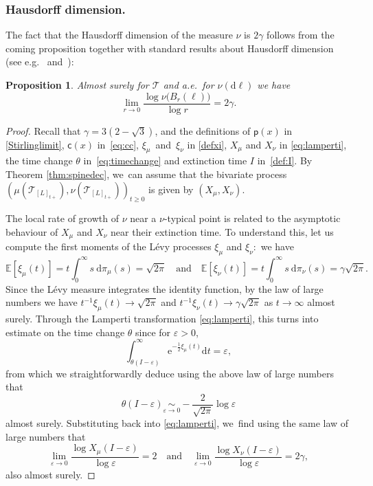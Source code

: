 \documentclass[11pt]{article}
\let\dH\gamma
\newcommand{\pp}{\mathsf{p}}
\newcommand{\cc}{\mathsf{c}}\let\ff\cc
\newcommand{\T}{\mathcal{T}}\let\CRT\T\let\tbr\T
\let\veps\varepsilon
\newtheorem{prop}[thm]{Proposition}
\theoremstyle{definition}
\begin{document}
\subsubsection*{Hausdorff dimension.}

The fact that the Hausdorff dimension of the measure $\nu$ is $2 \dH$ follows from the coming proposition together with standard results about Hausdorff dimension (see e.g.~\cite[Lem.\,4.1]{lyons1995ergodic} and~\cite[\S 14]{billingsley1965}):

\begin{prop}\label{prop:continuous Hausdorff} Almost surely for $\mathcal{T}$ and a.e.\ for $\nu(\mathrm{d}\ell)$ we have
\[
\lim_{r \to 0} \frac{\log \nu \big(B_r(\ell)\big) }{\log r} = 2 \dH.
\]
\end{prop}

\begin{proof}
Recall that $\gamma=3(2-\sqrt{3})$, and the definitions of $\pp(x)$ in \eqref{Stirlinglimit}, $\cc(x)$ in~\eqref{eq:cc}, $\xi_\mu$~and~$\xi_\nu$ in \eqref{defxi}, $X_\mu$ and $X_\nu$ in \eqref{eq:lamperti}, the time change $\theta$ in~\eqref{eq:timechange} and extinction time $I$ in~\eqref{def:I}. By Theorem \ref{thm:spinedec}, we~can assume that the bivariate process $(\mu(\T_{[L]_{t+}}),\nu(\T_{[L]_{t+}}))_{t\geq 0}$ is given by $(X_\mu,X_\nu)$.

The local rate of growth of $\nu$ near a $\nu$-typical point is related to the asymptotic behaviour of $X_\mu$ and $X_\nu$ near their extinction time. To understand this, let us compute the first moments of the Lévy processes $\xi_\mu$ and $\xi_\nu:$ we have
\[
\mathbb{E}[\xi_\mu(t)] = t \int_0^{\infty} s\ \mathrm{d}\pi_\mu(s) = \sqrt{2 \pi} \quad \text{and}\quad \mathbb{E}[\xi_\nu(t)] = t \int_0^{\infty} s\ \mathrm{d}\pi_\nu(s) = \dH \sqrt{2\pi}.
\]
Since the Lévy measure integrates the identity function, by the law of large numbers we have $t^{-1}\xi_\mu (t) \to \sqrt{2 \pi}$ and $t^{-1}\xi_\nu (t) \to \dH \sqrt{2\pi}$ as $t \to \infty$ almost surely. Through the Lamperti transformation \eqref{eq:lamperti}, this turns into estimate on the time change $\theta$ since for $\veps>0$,
\[
\int_{\theta(I-\veps)}^{\infty} \mathrm{e}^{-\frac12 \xi_\mu(t)}\mathrm dt=\veps,
\]
from which we straightforwardly deduce using the above law of large numbers that
\[
\theta(I-\veps)\underset{\veps\to 0}\sim-\frac2{\sqrt{2\pi}}\log \veps
\]
almost surely. Substituting back into \eqref{eq:lamperti}, we~find using the same law of large numbers that
\[
\lim_{ \varepsilon \to 0}\frac{\log X_\mu(I - \varepsilon)}{\log \varepsilon} =2\quad \text{and} \quad \lim_{ \varepsilon \to 0}\frac{\log X_\nu(I - \varepsilon)}{\log \varepsilon} = 2\dH,
\]
also almost surely.


\end{proof}
\end{document}
